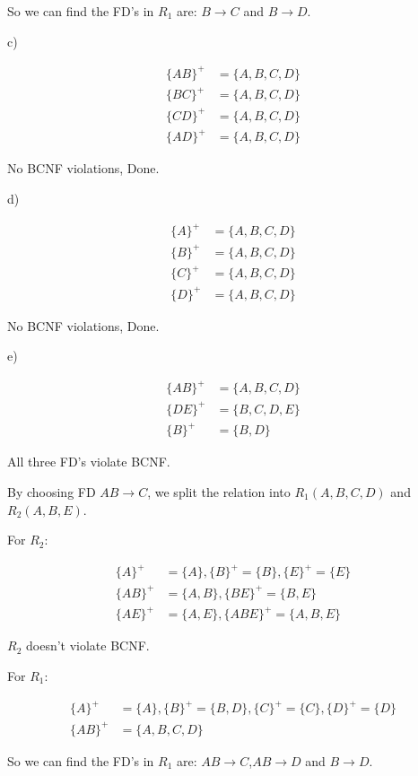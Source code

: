 \documentclass[../../main.tex]{subfiles}
\begin{document}
So we can find the FD's in $R_{1}$ are: $B \to C$ and $B \to D$.

c)

\begin{align*}
  \{AB\}^{+} &= \{A,B,C,D\} \\
  \{BC\}^{+} &= \{A,B,C,D\} \\
  \{CD\}^{+} &= \{A,B,C,D\} \\
  \{AD\}^{+} &= \{A,B,C,D\}
\end{align*}

No BCNF violations, Done.

d)

\begin{align*}
  \{A\}^{+} &= \{A,B,C,D\} \\
  \{B\}^{+} &= \{A,B,C,D\} \\
  \{C\}^{+} &= \{A,B,C,D\} \\
  \{D\}^{+} &= \{A,B,C,D\}
\end{align*}

No BCNF violations, Done.

e)

\begin{align*}
  \{AB\}^{+} &= \{A,B,C,D\} \\
  \{DE\}^{+} &= \{B,C,D,E\} \\
  \{B\}^{+}  &= \{B,D\}
\end{align*}

All three FD's violate BCNF.

By choosing FD $AB \to C$, we split the relation into
$R_{1}(A,B,C,D)$ and $R_{2}(A,B,E)$.

For $R_{2}$:

\begin{align*}
  \{A\}^+ &= \{A\}, \{B\}^+ = \{B\}, \{E\}^+ = \{E\} \\
  \{AB\}^+ &= \{A, B\}, \{BE\}^+ = \{B,E\} \\
  \{AE\}^+ &= \{A, E\}, \{ABE\}^+ = \{A, B, E\}
\end{align*}

$R_{2}$ doesn't violate BCNF.

For $R_{1}$:

\begin{align*}
  \{A\}^+ &= \{A\}, \{B\}^+ = \{B, D\},
  \{C\}^+ = \{C\}, \{D\}^+ = \{D\} \\
  \{AB\}^+ &= \{A,B,C,D\}
\end{align*}

So we can find the FD's in $R_{1}$ are: $AB \to C$,$AB \to D$
and $B \to D$.
\end{document}
